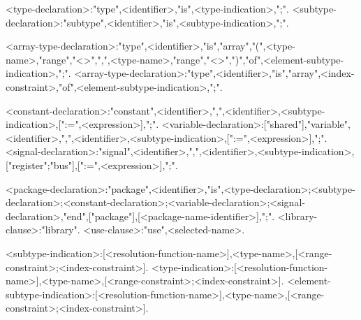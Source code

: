 <type-declaration>:"type",<identifier>,"is",<type-indication>,";".
<subtype-declaration>:"subtype",<identifier>,"is",<subtype-indication>,";".

<array-type-declaration>:"type",<identifier>,"is","array","(",<type-name>,"range","<>",{",",<type-name>,"range","<>"},")","of",<element-subtype-indication>,";".
<array-type-declaration>:"type",<identifier>,"is","array",<index-constraint>,"of",<element-subtype-indication>,";".

<constant-declaration>:"constant",<identifier>,{",",<identifier>},<subtype-indication>,[":=",<expression>],";".
<variable-declaration>:["shared"],"variable",<identifier>,{",",<identifier>},<subtype-indication>,[":=",<expression>],";".
<signal-declaration>:"signal",<identifier>,{",",<identifier>},<subtype-indication>,["register";"bus"],[":=",<expression>],";".

<package-declaration>:"package",<identifier>,"is",{<type-declaration>;<subtype-declaration>;<constant-declaration>;<variable-declaration>;<signal-declaration>},"end",["package"],[<package-name-identifier>],";".
<library-clause>:"library".
<use-clause>:"use",<selected-name>.

<subtype-indication>:[<resolution-function-name>],<type-name>,[<range-constraint>;<index-constraint>].
<type-indication>:[<resolution-function-name>],<type-name>,[<range-constraint>;<index-constraint>].
<element-subtype-indication>:[<resolution-function-name>],<type-name>,[<range-constraint>;<index-constraint>].